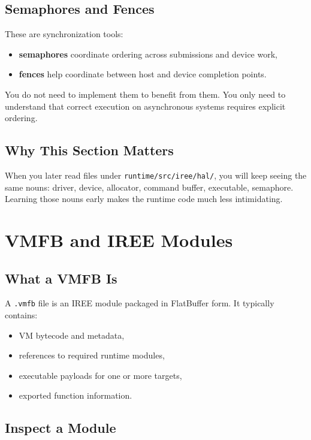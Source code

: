 \documentclass[11pt,a4paper]{article}
\begin{document}
\subsection{Semaphores and Fences}

These are synchronization tools:
\begin{itemize}
    \item \textbf{semaphores} coordinate ordering across submissions and device work,
    \item \textbf{fences} help coordinate between host and device completion points.
\end{itemize}

You do not need to implement them to benefit from them. You only need to understand that correct execution on asynchronous systems requires explicit ordering.

\subsection{Why This Section Matters}

When you later read files under \texttt{runtime/src/iree/hal/}, you will keep seeing the same nouns: driver, device, allocator, command buffer, executable, semaphore. Learning those nouns early makes the runtime code much less intimidating.

\section{VMFB and IREE Modules}

\subsection{What a VMFB Is}

A \texttt{.vmfb} file is an IREE module packaged in FlatBuffer form. It typically contains:
\begin{itemize}
    \item VM bytecode and metadata,
    \item references to required runtime modules,
    \item executable payloads for one or more targets,
    \item exported function information.
\end{itemize}

\subsection{Inspect a Module}
\end{document}
